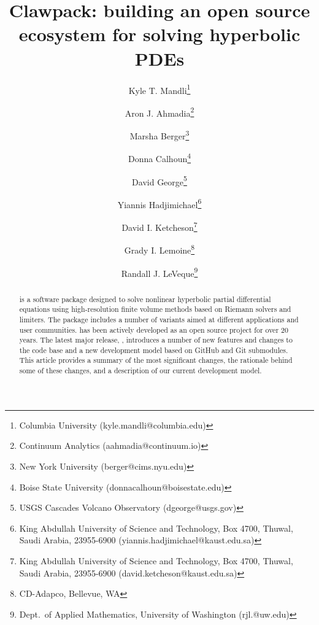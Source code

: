 \documentclass[]{article}
\begin{document}
\ifpdf
{}
\else
{}
\fi

\title{Clawpack: building an open source ecosystem for solving hyperbolic PDEs}


\author{
        Kyle T. Mandli\thanks{
            Columbia University (\mbox{kyle.mandli@columbia.edu})} \and
        Aron J. Ahmadia\thanks{
            Continuum Analytics (\mbox{aahmadia@continuum.io})} \and
        Marsha Berger\thanks{
            New York University (\mbox{berger@cims.nyu.edu})} \and
        Donna Calhoun\thanks{
            Boise State University (\mbox{donnacalhoun@boisestate.edu})} \and
        David George\thanks{
            USGS Cascades Volcano Observatory (\mbox{dgeorge@usgs.gov})} \and
        Yiannis Hadjimichael\thanks{
            King Abdullah University of Science and Technology, Box 4700, Thuwal, Saudi Arabia, 23955-6900 (\mbox{yiannis.hadjimichael@kaust.edu.sa})} \and
        David I. Ketcheson\thanks{
            King Abdullah University of Science and Technology, Box 4700, Thuwal, Saudi Arabia, 23955-6900 (\mbox{david.ketcheson@kaust.edu.sa})} \and
        Grady I. Lemoine\thanks{
            CD-Adapco, Bellevue, WA} \and
        Randall J. LeVeque\thanks{
            Dept.\ of Applied Mathematics, University of Washington (\mbox{rjl.@uw.edu})}
        }

\maketitle
\linenumbers
\begin{abstract}
    \clawpack is a software package designed to solve nonlinear
hyperbolic partial differential equations using high-resolution finite volume
methods based on Riemann solvers and limiters. The package includes a number
of variants aimed at different applications and user communities.
\clawpack has been actively developed as an open source project
for over 20 years.  The latest major release, , introduces
a number of new features and changes to the code base and a new
development model based on GitHub and Git submodules.  
This article provides a summary of the most significant changes,
the rationale behind some of these changes, and a description of our current
development model.
\end{abstract}













\end{document}

